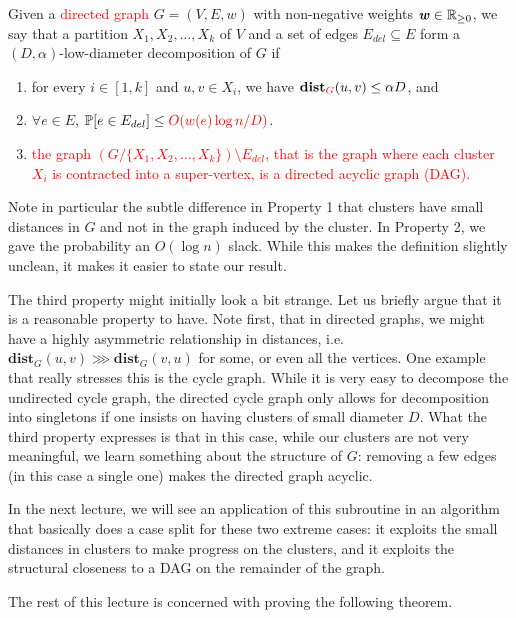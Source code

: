 \begin{definition}
Given a \textcolor{red}{directed graph} $G = (V,E,w)$ with non-negative weights $\boldsymbol{\mathit{w}} \in \mathbb{R}_{\geq 0}$, we say that a partition $X_1, X_2, \ldots, X_k$ of $V$ and a set of edges $E_{del} \subseteq E$ form a $(D, \alpha)$-low-diameter decomposition of $G$ if
\begin{enumerate}
\item for every $i \in [1, k]$ and $u,v \in X_i$, we have $\mathbf{dist}_{\textcolor{red}{G}}(u,v) \leq \alpha D$, and
\item $\forall e \in E$, $\mathbb{P}[e \in E_{del}] \leq \textcolor{red}{O(w(e) \log n/ D)}$.
\item \textcolor{red}{the graph $(G / \{X_1, X_2, \ldots, X_k\}) \setminus E_{del}$, that is the graph where each cluster $X_i$ is contracted into a super-vertex, is a directed acyclic graph (DAG).}
\end{enumerate}
\end{definition}

Note in particular the subtle difference in Property 1 that clusters have small distances in $G$ and not in the graph induced by the cluster. In Property 2, we gave the probability an $O(\log n)$ slack. While this makes the definition slightly unclean, it makes it easier to state our result.

The third property might initially look a bit strange. Let us briefly argue that it is a reasonable property to have. Note first, that in directed graphs, we might have a highly asymmetric relationship in distances, i.e. $\mathbf{dist}_G(u,v) \ggg \mathbf{dist}_G(v,u)$ for some, or even all the vertices. One example that really stresses this is the cycle graph. While it is very easy to decompose the undirected cycle graph, the directed cycle graph only allows for decomposition into singletons if one insists on having clusters of small diameter $D$. What the third property expresses is that in this case, while our clusters are not very meaningful, we learn something about the structure of $G$: removing a few edges (in this case a single one) makes the directed graph acyclic. 

In the next lecture, we will see an application of this subroutine in an algorithm that basically does a case split for these two extreme cases: it exploits the small distances in clusters to make progress on the clusters, and it exploits the structural closeness to a DAG on the remainder of the graph.

The rest of this lecture is concerned with proving the following theorem.

